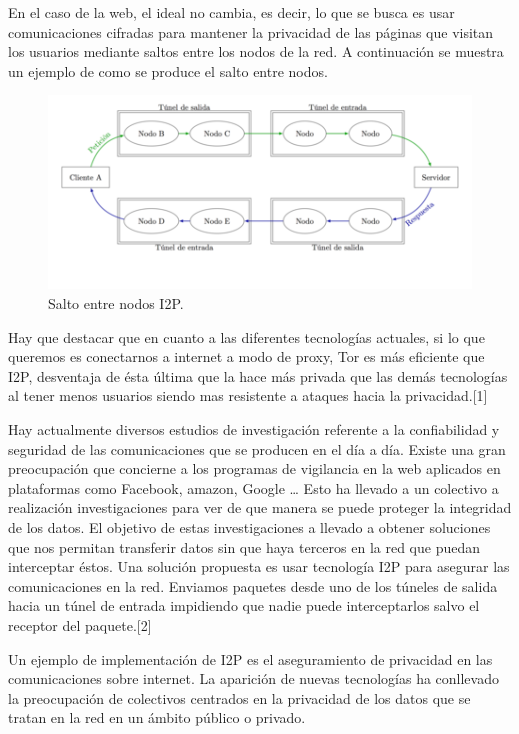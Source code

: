 \documentclass[12]{article}
\begin{document}
En el caso de la web, el ideal no cambia, es decir, lo que se busca es usar comunicaciones cifradas para mantener la privacidad de las páginas que visitan los usuarios mediante saltos entre los nodos de la red. A continuación se muestra un ejemplo de como se produce el salto entre nodos.

\begin{figure}[H]
    \centering
    \includegraphics[width=1\textwidth]{media/salto_nodos.png}
    \caption{Salto entre nodos I2P.}
    \label{fig4}
\end{figure}

Hay que destacar que en cuanto a las diferentes tecnologías actuales, si lo que queremos es conectarnos a internet a modo de proxy,  Tor es más eficiente que I2P, desventaja de ésta última que la hace más privada que las demás tecnologías al tener menos usuarios siendo mas resistente a ataques hacia la privacidad.[1]

Hay actualmente diversos estudios de investigación referente a la confiabilidad y seguridad de las comunicaciones que se producen en el día a día.
Existe una gran preocupación que concierne a los programas de vigilancia en la web aplicados en plataformas como Facebook, amazon, Google … Esto ha llevado a un colectivo a realización investigaciones para ver de que manera se puede proteger la integridad de los datos. El objetivo de estas investigaciones a llevado a obtener soluciones que nos permitan transferir datos sin que haya terceros
en la red que puedan interceptar éstos.
Una solución propuesta es usar tecnología I2P para asegurar las comunicaciones en la red. Enviamos paquetes desde uno de los túneles de salida hacia un túnel de entrada  impidiendo que nadie puede interceptarlos salvo el receptor del paquete.[2]

Un ejemplo de implementación de I2P es el aseguramiento de privacidad en las comunicaciones sobre internet.
La aparición de nuevas tecnologías ha conllevado la preocupación de colectivos centrados en la privacidad de los datos que se tratan en la red en un ámbito público o privado.
\end{document}
